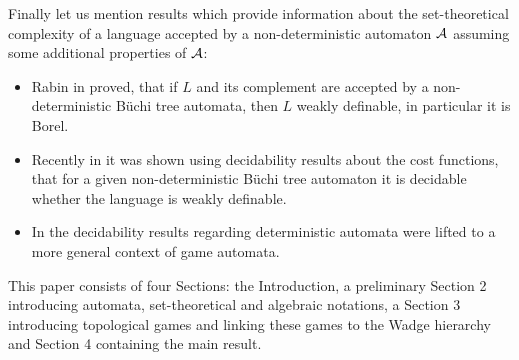 Finally let us mention results which provide information about the set-theoretical complexity of a language accepted by a non-deterministic automaton ${\mathcal A}$ assuming some additional properties of ${\mathcal A}$:
\begin{itemize}
\item Rabin in \cite{rabin} proved, that if $L$ and its complement are accepted by a non-deterministic Büchi tree automata, then $L$ weakly definable, in particular it is Borel.
\item Recently in \cite{cklvb} it was shown using decidability results about the cost functions, that for a given non-deterministic Büchi tree automaton it is decidable whether the language is weakly definable. 
\item In \cite{fms} the decidability results regarding deterministic automata were lifted to 
a more general context of game automata.
\end{itemize}
This paper consists of four Sections: the Introduction, a preliminary Section 2 introducing automata, set-theoretical and algebraic notations, a Section 3 introducing topological games and linking these games to the Wadge hierarchy and Section 4 containing the main result.
